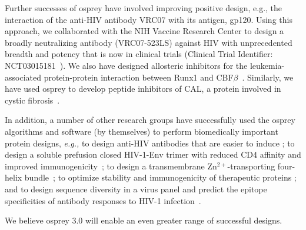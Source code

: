 Further successes of {\sc osprey} have involved improving positive design, e.g., the interaction of the anti-HIV antibody VRC07 with its antigen, gp120.  Using this approach, we collaborated with the NIH Vaccine Research Center to design a broadly neutralizing antibody (VRC07-523LS) against HIV with unprecedented breadth and potency that is now in clinical trials (Clinical Trial Identifier: NCT03015181~\cite{VRC07_enhance,clinical605}).  We also have designed allosteric inhibitors for the leukemia-associated protein-protein interaction between Runx1 and CBF$\beta$~\cite{runx1_cbfb}.  Similarly, we have used {\sc osprey} to develop peptide inhibitors of CAL, a protein involved in cystic fibrosis~\cite{CFTR}.  

In addition, a number of other research groups have successfully used the {\sc osprey} algorithms and software (by themselves) to perform biomedically important protein designs, {\em e.g.,} to design anti-HIV antibodies that are easier to induce \cite{Georgiev:2014aa}; to design a soluble prefusion closed HIV-1-Env trimer with reduced CD4 affinity and improved immunogenicity~\cite{Gwo-yu17}; to design a transmembrane Zn$^{2+}$-transporting four-helix bundle~\cite{Joh14}; to optimize stability and immunogenicity of therapeutic proteins \cite{Parker:2013aa,Salvat:2015aa,Zhao:2015aa}; and to design sequence diversity in a virus panel and predict the epitope specificities of antibody responses to HIV-1 infection~\cite{polyclonal17}.

We believe {\sc osprey} 3.0 will enable an even greater range of successful designs.  
